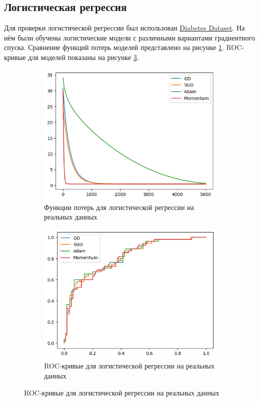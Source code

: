 \documentclass{article}
\begin{document}
\subsection*{Логистическая регрессия}
Для проверки логистической регрессии был использован \href{https://www.kaggle.com/datasets/mathchi/diabetes-data-set}{Diabetes Dataset}. На нём были обучены логистические модели с различными вариантами градиентного спуска. Сравнение функций потерь моделей представлено на рисунке \ref{log_real}. ROC-кривые для моделей 
показаны на рисунке \ref{log_real_roc}.

\begin{figure}[h]
  \begin{subfigure}{.5\textwidth}
  \centering
    \includegraphics[width=0.9\linewidth]{lin_real.png}
    \caption{Функции потерь для логистической регрессии на реальных данных}
    \label{log_real}
  \end{subfigure}%
  \begin{subfigure}{.5\textwidth}
  \centering
    \includegraphics[width=0.9\linewidth]{log_real_roc.png}
    \caption{ROC-кривые для логистической регрессии на реальных данных}
    \label{log_real_roc}
  \end{subfigure}
\end{figure}
\end{document}
